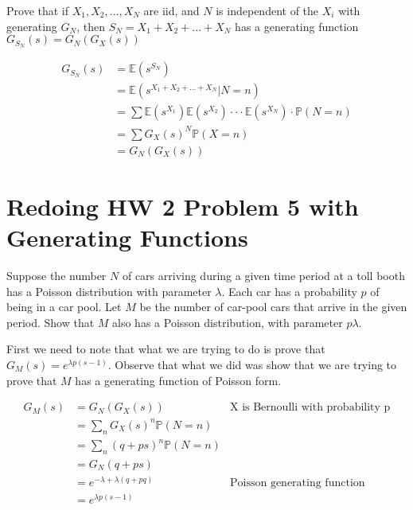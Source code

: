\documentclass[11pt]{article}
\begin{document}
Prove that if $X_1, X_2, ..., X_N$ are iid, and $N$ is independent of the $X_i$ with generating $G_N$, then $S_N = X_1 + X_2 + ... + X_N$ has a generating function $G_{S_N}(s) = G_N(G_X(s))$

\begin{align}
G_{S_N}(s) &= \mathbb{E}(s^{S_N}) \\
&= \mathbb{E}(s^{X_1 + X_2 + ... + X_N}|N=n) \\
&= \sum \mathbb{E}(s^{X_1}) \mathbb{E}(s^{X_2}) \cdot \cdot \cdot \mathbb{E}(s^{X_N}) \cdot \mathbb{P}(N=n) \\
&= \sum G_X(s)^N \mathbb{P}(X=n) \\
&= G_N(G_X(s))
\end{align}

\section{Redoing HW 2 Problem 5 with Generating Functions}

Suppose the number $N$ of cars arriving during a given time period at a toll booth has a Poisson distribution with parameter $\lambda$. Each car has a probability $p$ of being in a car pool. Let $M$ be the number of car-pool cars that arrive in the given period. Show that $M$ also has a Poisson distribution, with parameter $p\lambda$. 

First we need to note that what we are trying to do is prove that $G_M(s) = e^{\lambda p (s - 1)}$. Observe that what we did was show that we are trying to prove that $M$ has a generating function of Poisson form.

\begin{align}
G_M(s) &= G_N(G_X(s)) & \text{X is Bernoulli with probability p} \\
&= \sum_{n} G_X(s)^n \mathbb{P}(N=n) \\
&= \sum_n (q+ps)^n \mathbb{P}(N=n) \\
&= G_N(q+ps) \\
&= e^{-\lambda + \lambda(q+pq)} & \text{Poisson generating function} \\
&= e^{\lambda p (s - 1)}
\end{align}
\end{document}
